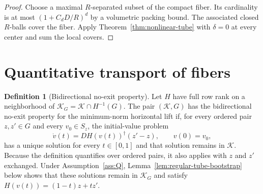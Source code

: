 \documentclass[11pt]{article}
\theoremstyle{definition}
\newtheorem{definition}[theorem]{Definition}
\begin{document}
\begin{proof}
Choose a maximal $R$-separated subset of the compact fiber.  Its cardinality
is at most $(1+C_dD/R)^d$ by a volumetric packing bound.  The associated
closed $R$-balls cover the fiber.  Apply
Theorem~\ref{thm:nonlinear-tube} with $\delta=0$ at every center and sum the
local covers.
\end{proof}

\section{Quantitative transport of fibers}

\begin{definition}[Bidirectional no-exit property]\label{def:no-exit}
Let $H$ have full row rank on a neighborhood of
$\mathcal K_G=\mathcal K\cap H^{-1}(G)$.  The pair $(\mathcal K,G)$ has the
bidirectional no-exit property for the minimum-norm horizontal lift if, for
every ordered pair $z,z'\in G$ and every $v_0\in S_z$, the initial-value problem
\[
 \dot v(t)=DH(v(t))^\dagger(z'-z),\qquad v(0)=v_0,
\]
has a unique solution for every $t\in[0,1]$ and that solution remains in
$\mathcal K$.  Because the definition quantifies over ordered pairs, it also
applies with $z$ and $z'$ exchanged.  Under Assumption~\ref{ass:Q},
Lemma~\ref{lem:regular-tube-bootstrap} below shows that these solutions remain
in $\mathcal K_G$ and satisfy $H(v(t))=(1-t)z+tz'$.
\end{definition}
\end{document}
